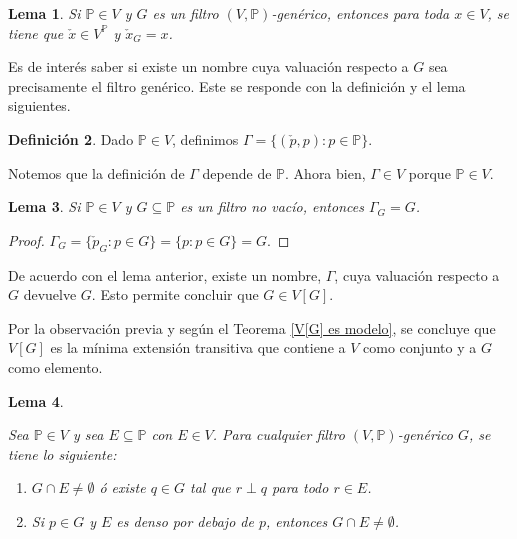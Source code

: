 \documentclass[11pt]{unam_tesis1}
\theoremstyle{MyThmStyle}
\theoremstyle{definition}
\newtheorem{definition}{Definici\'on}[chapter]
\theoremstyle{plain}
\newtheorem{lemma}[definition]{Lema}
\theoremstyle{remark}
\begin{document}
\begin{lemma}\label{valuacioncanonica}
Si $\mathbb P\in V$ y $G$ es un filtro $(V,\mathbb P)$-gen\'erico, entonces para toda $x\in V$, se tiene que $\check{x}\in V^{\mathbb P}$ y $\check{x}_G=x$.
\end{lemma}

Es de inter\'es saber si existe un nombre cuya valuaci\'on respecto a $G$ sea precisamente el filtro gen\'erico. Este se responde con la definici\'on y el lema siguientes.

\begin{definition}\label{Gamma}
Dado $\mathbb P\in V$, definimos $\Gamma=\{(\check{p},p):p\in \mathbb P\}$.
\end{definition}

Notemos que la definici\'on de $\Gamma$ depende de $\mathbb P$. Ahora bien, $\Gamma\in V$ porque $\mathbb P\in V$. %

\begin{lemma}\label{GammaesG}
Si $\mathbb P\in V$ y $G\subseteq \mathbb P$ es un filtro no vac\'io, entonces $\Gamma_G=G$.
\end{lemma}

\begin{proof}
$\Gamma_G=\{\check{p}_G:p\in G \}=\{p:p\in G \}=G$.
\end{proof}

De acuerdo con el lema anterior, existe un nombre, $\Gamma$, cuya valuaci\'on respecto a $G$ devuelve $G$. Esto permite concluir que $G\in V[G]$.

Por la observaci\'on previa y seg\'un el Teorema \ref{V[G] es modelo}, se concluye que $V[G]$ es la m\'inima extensi\'on transitiva que contiene a $V$ como conjunto y a $G$ como elemento.


\begin{lemma}\label{lemadenso}

Sea $\mathbb P\in V$ y sea $E\subseteq \mathbb P$ con $E\in V$. Para cualquier filtro $(V,\mathbb P)$-gen\'erico $G$, se tiene lo siguiente:

\begin{enumerate}
\item $G\cap E\neq \emptyset$ \'o existe $q\in G$ tal que $r\perp q$ para todo $r\in E$.
\item Si $p\in G$ y $E$ es denso por debajo de $p$, entonces $G\cap E\neq \emptyset$.

\end{enumerate}

\end{lemma}
\end{document}
